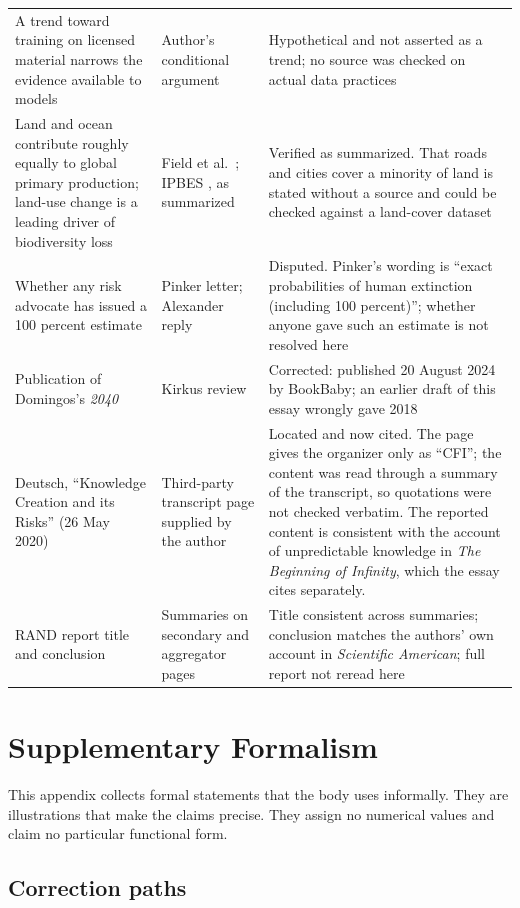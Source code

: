 \documentclass[11pt]{article}
\begin{document}
\begin{center}
\begin{tabular}{@{}p{}p{}p{}@{}}
A trend toward training on licensed material narrows the evidence available to models & Author's conditional argument & Hypothetical and not asserted as a trend; no source was checked on actual data practices\\[0.4em]
Land and ocean contribute roughly equally to global primary production; land-use change is a leading driver of biodiversity loss & Field et al.\ \cite{field1998}; IPBES \cite{ipbes2019}, as summarized & Verified as summarized. That roads and cities cover a minority of land is stated without a source and could be checked against a land-cover dataset\\[0.4em]
Whether any risk advocate has issued a 100 percent estimate & Pinker letter; Alexander reply & Disputed. Pinker's wording is ``exact probabilities of human extinction (including 100 percent)''; whether anyone gave such an estimate is not resolved here\\[0.4em]
Publication of Domingos's \emph{2040} & Kirkus review & Corrected: published 20 August 2024 by BookBaby; an earlier draft of this essay wrongly gave 2018\\[0.4em]
Deutsch, ``Knowledge Creation and its Risks'' (26 May 2020) & Third-party transcript page supplied by the author & Located and now cited. The page gives the organizer only as ``CFI''; the content was read through a summary of the transcript, so quotations were not checked verbatim. The reported content is consistent with the account of unpredictable knowledge in \emph{The Beginning of Infinity}, which the essay cites separately.\\[0.4em]
RAND report title and conclusion & Summaries on secondary and aggregator pages & Title consistent across summaries; conclusion matches the authors' own account in \emph{Scientific American}; full report not reread here\\
\bottomrule
\end{tabular}
\end{center}

\section{Supplementary Formalism}\label{app:formal}

This appendix collects formal statements that the body uses informally. They are illustrations that make the claims precise. They assign no numerical values and claim no particular functional form.

\subsection{Correction paths}
\end{document}
